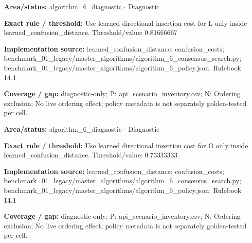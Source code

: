 \begin{tcolorbox}[enhanced,breakable,colback=white,colframe=Muted!45,boxrule=0.45pt,arc=1.5pt,left=6pt,right=6pt,top=5pt,bottom=5pt,title={\texttt{A6-LEARNED-INSERTION-L}},title after break={\texttt{A6-LEARNED-INSERTION-L}\ (continued)},fonttitle=\headingfont\bfseries\color{Navy},coltitle=Navy]
\textbf{Area/status:} algorithm\_\allowbreak{}6\_\allowbreak{}diagnostic $\boldsymbol{\cdot}$ Diagnostic\par
\smallskip
\textbf{Exact rule / threshold:} Use learned directional insertion cost for L only inside learned\_\allowbreak{}confusion\_\allowbreak{}distance. Threshold/\allowbreak{}value: 0.81666667\par
\smallskip
\textbf{Implementation source:} learned\_\allowbreak{}confusion\_\allowbreak{}distance; confusion\_\allowbreak{}costs; benchmark\_\allowbreak{}01\_\allowbreak{}legacy/\allowbreak{}master\_\allowbreak{}algorithms/\allowbreak{}algorithm\_\allowbreak{}6\_\allowbreak{}consensus\_\allowbreak{}search.py; benchmark\_\allowbreak{}01\_\allowbreak{}legacy/\allowbreak{}master\_\allowbreak{}algorithms/\allowbreak{}algorithm\_\allowbreak{}6\_\allowbreak{}policy.json; Rulebook 14.1\par
\smallskip
\textbf{Coverage / gap:} diagnostic-only; P: api\_\allowbreak{}scenario\_\allowbreak{}inventory.csv; N: Ordering exclusion; No live ordering effect; policy metadata is not separately golden-tested per cell.
\end{tcolorbox}
\begin{tcolorbox}[enhanced,breakable,colback=white,colframe=Muted!45,boxrule=0.45pt,arc=1.5pt,left=6pt,right=6pt,top=5pt,bottom=5pt,title={\texttt{A6-LEARNED-INSERTION-O}},title after break={\texttt{A6-LEARNED-INSERTION-O}\ (continued)},fonttitle=\headingfont\bfseries\color{Navy},coltitle=Navy]
\textbf{Area/status:} algorithm\_\allowbreak{}6\_\allowbreak{}diagnostic $\boldsymbol{\cdot}$ Diagnostic\par
\smallskip
\textbf{Exact rule / threshold:} Use learned directional insertion cost for O only inside learned\_\allowbreak{}confusion\_\allowbreak{}distance. Threshold/\allowbreak{}value: 0.73333333\par
\smallskip
\textbf{Implementation source:} learned\_\allowbreak{}confusion\_\allowbreak{}distance; confusion\_\allowbreak{}costs; benchmark\_\allowbreak{}01\_\allowbreak{}legacy/\allowbreak{}master\_\allowbreak{}algorithms/\allowbreak{}algorithm\_\allowbreak{}6\_\allowbreak{}consensus\_\allowbreak{}search.py; benchmark\_\allowbreak{}01\_\allowbreak{}legacy/\allowbreak{}master\_\allowbreak{}algorithms/\allowbreak{}algorithm\_\allowbreak{}6\_\allowbreak{}policy.json; Rulebook 14.1\par
\smallskip
\textbf{Coverage / gap:} diagnostic-only; P: api\_\allowbreak{}scenario\_\allowbreak{}inventory.csv; N: Ordering exclusion; No live ordering effect; policy metadata is not separately golden-tested per cell.
\end{tcolorbox}
